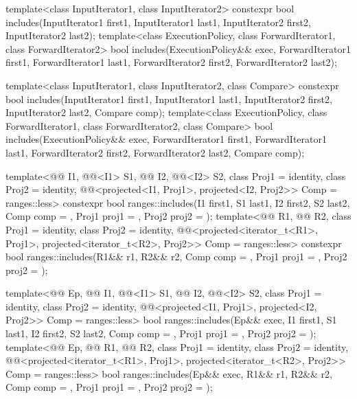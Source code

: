 %
\begin{itemdecl}
template<class InputIterator1, class InputIterator2>
  constexpr bool includes(InputIterator1 first1, InputIterator1 last1,
                          InputIterator2 first2, InputIterator2 last2);
template<class ExecutionPolicy, class ForwardIterator1, class ForwardIterator2>
  bool includes(ExecutionPolicy&& exec,
                ForwardIterator1 first1, ForwardIterator1 last1,
                ForwardIterator2 first2, ForwardIterator2 last2);

template<class InputIterator1, class InputIterator2, class Compare>
  constexpr bool includes(InputIterator1 first1, InputIterator1 last1,
                          InputIterator2 first2, InputIterator2 last2,
                          Compare comp);
template<class ExecutionPolicy, class ForwardIterator1, class ForwardIterator2, class Compare>
  bool includes(ExecutionPolicy&& exec,
                ForwardIterator1 first1, ForwardIterator1 last1,
                ForwardIterator2 first2, ForwardIterator2 last2,
                Compare comp);

template<@@ I1, @@<I1> S1, @@ I2, @@<I2> S2,
         class Proj1 = identity, class Proj2 = identity,
         @@<projected<I1, Proj1>,
                                    projected<I2, Proj2>> Comp = ranges::less>
  constexpr bool ranges::includes(I1 first1, S1 last1, I2 first2, S2 last2, Comp comp = {},
                                  Proj1 proj1 = {}, Proj2 proj2 = {});
template<@@ R1, @@ R2, class Proj1 = identity,
         class Proj2 = identity,
         @@<projected<iterator_t<R1>, Proj1>,
                                    projected<iterator_t<R2>, Proj2>> Comp = ranges::less>
  constexpr bool ranges::includes(R1&& r1, R2&& r2, Comp comp = {},
                                  Proj1 proj1 = {}, Proj2 proj2 = {});

template<@@ Ep, @@ I1, @@<I1> S1,
         @@ I2, @@<I2> S2,
         class Proj1 = identity, class Proj2 = identity,
         @@<projected<I1, Proj1>, projected<I2, Proj2>> Comp =
           ranges::less>
  bool ranges::includes(Ep&& exec, I1 first1, S1 last1, I2 first2, S2 last2,
                        Comp comp = {}, Proj1 proj1 = {}, Proj2 proj2 = {});
template<@@ Ep, @@ R1, @@ R2,
         class Proj1 = identity, class Proj2 = identity,
         @@<projected<iterator_t<R1>, Proj1>,
                                     projected<iterator_t<R2>, Proj2>> Comp = ranges::less>
  bool ranges::includes(Ep&& exec, R1&& r1, R2&& r2,
                        Comp comp = {}, Proj1 proj1 = {}, Proj2 proj2 = {});
\end{itemdecl}

